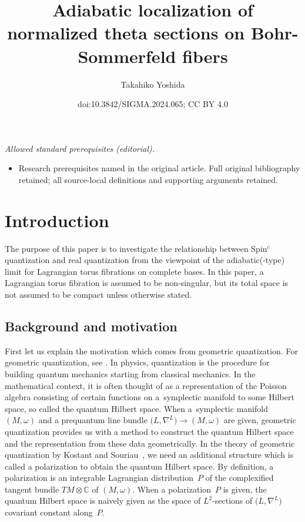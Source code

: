 \documentclass[10pt,a4paper]{amsart}
\title{Adiabatic localization of normalized theta sections on Bohr-Sommerfeld fibers}
\author{Takahiko Yoshida}
\date{doi:10.3842/SIGMA.2024.065; CC BY 4.0}
\numberwithin{equation}{section}
\newcommand{\C}{\mathbb{C}}
\begin{document}
\maketitle
\noindent\textit{Allowed standard prerequisites (editorial).}\begin{itemize}
\item Research prerequisites named in the original article. Full original bibliography retained; all source-local definitions and supporting arguments retained.
\end{itemize}\medskip
\section{Introduction}
The purpose of this paper is to investigate the relationship between Spin${}^c$ quantization and real quantization from the viewpoint of the adiabatic(-type) limit for Lagrangian torus fibrations on complete bases. In this paper, a Lagrangian torus fibration is assumed to be non-singular, but its total space is not assumed to be compact unless otherwise stated.

\subsection{Background and motivation}
First let us explain the motivation which comes from geometric quantization. For geometric quantization, see \cite{Hall, Ki2,Sn,Woodhouse}. In physics, quantization is the procedure for building quantum mechanics starting from classical mechanics. In the mathematical context, it is often thought of as a representation of the Poisson algebra consisting of certain functions on a~symplectic manifold to some Hilbert space, so called the quantum Hilbert space. When a~symplectic manifold~$(M,\omega)$ and a prequantum line bundle $\bigl(L,\nabla^L\bigr)\to (M,\omega)$ are given, geometric quantization provides us with a method to construct the quantum Hilbert space and the representation from these data
geometrically. In the theory of geometric quantization by Kostant and Souriau~\cite{Kos1,Sou2, Sou1}, we need an additional structure which is called a polarization to obtain the quantum Hilbert space. By definition, a polarization is an integrable Lagrangian distribution~$P$ of the complexified tangent bundle $TM\otimes \C$ of $(M,\omega)$. When a polarization~$P$ is given, the quantum Hilbert space is naively given as the space of $L^2$-sections of $\bigl(L,\nabla^L\bigr)$ covariant constant along~$P$.
\end{document}
